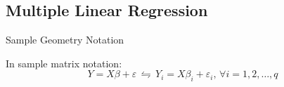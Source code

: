 \begin{itemize}[topsep=2pt,itemsep=2pt]
\begin{itemize}[topsep=2pt,itemsep=2pt]
            
        \end{itemize}
        
            
        

        
        
    
\end{itemize}



    
\subsection{Multiple Linear Regression}

\begin{point}
    Sample Geometry Notation
\end{point}

    In sample matrix notation:
    \begin{equation}
        Y=X\beta+\varepsilon \,\leftrightharpoons\, Y_i=X\beta _i+\varepsilon _i,\,\forall i=1,2,\ldots,q
    \end{equation}
    
